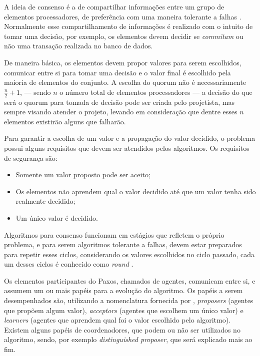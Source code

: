 \documentclass[
    12pt,
    openright, 
    oneside,
    a4paper,
    french,
    english,
    brazil
    ]{facom-ufu-abntex2}
\theoremstyle{definition}
\begin{document}
A ideia de consenso é a de compartilhar informações entre um grupo de elementos
processadores, de preferência com uma maneira tolerante a falhas \cite{barborak1993consensus}.
Normalmente esse compartilhamento de informações é realizado com o intuito de tomar
uma decisão, por exemplo, os elementos devem decidir se \emph{commitam} ou não
uma transação realizada no banco de dados. 

De maneira básica, os elementos devem propor valores para serem escolhidos, 
comunicar entre si para tomar uma decisão e o valor final é escolhido pela maioria de 
elementos do conjunto. A escolha do quorum não é necessariamente $\frac{n}{2}+1$, --- sendo $n$ o número
total de elementos processadores --- a decisão do que será o quorum para tomada de decisão
pode ser criada pelo projetista, mas sempre visando atender o projeto, levando
em consideração que dentre esses $n$ elementos existirão alguns que falharão.

Para garantir a escolha de um valor e a propagação do valor decidido, o problema
possui alguns requisitos que devem ser atendidos pelos algoritmos. Os requisitos de
segurança são: 

\begin{itemize}
    \item Somente um valor proposto pode ser aceito;
    \item Os elementos não aprendem qual o valor decidido até que um valor 
    tenha sido realmente decidido;
    \item Um único valor é decidido.
\end{itemize}

Algoritmos para consenso funcionam em estágios que refletem o próprio problema, e para
serem algoritmos tolerante a falhas, devem estar preparados para repetir esses ciclos,
considerando os valores escolhidos no ciclo passado, cada um desses ciclos é conhecido como
\emph{round} \cite{camargos2008multicoordinated}.

Os elementos participantes do Paxos, chamados de agentes, comunicam entre si, e assumem 
um ou mais papéis para a evolução do algoritmo. Os papéis a serem desempenhados são, 
utilizando a nomenclatura fornecida por \cite{lamport2001paxos}, 
\emph{proposers} (agentes que propõem algum valor), \emph{acceptors} 
(agentes que escolhem um único valor) e \emph{learners} (agentes que aprendem
qual foi o valor escolhido pelo algoritmo).
Existem alguns papéis de coordenadores, que podem ou não ser utilizados no algoritmo, 
sendo, por exemplo \emph{distinguished proposer}, que será explicado mais ao fim.
\end{document}
